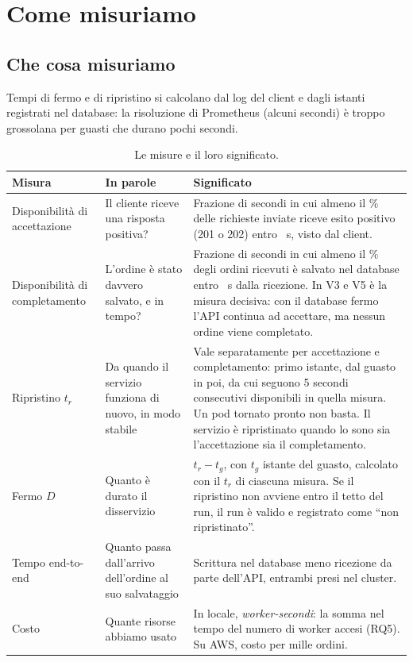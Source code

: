 \section{Come misuriamo}
\label{s:misura}

\subsection{Che cosa misuriamo}

Tempi di fermo e di ripristino si calcolano dal log del client e dagli istanti registrati nel database: la risoluzione di Prometheus (alcuni secondi) è troppo grossolana per guasti che durano pochi secondi.

\begin{table}[H]
\centering
\caption{Le misure e il loro significato.}
\label{tab:definizioni}
\begin{tabularx}{\linewidth}{@{}>{\raggedright\arraybackslash}p{2.9cm}>{\raggedright\arraybackslash}p{3.6cm}L@{}}
\toprule
\textbf{Misura} & \textbf{In parole} & \textbf{Significato} \\
\midrule
Disponibilità di accettazione & Il cliente riceve una risposta positiva? & Frazione di secondi in cui almeno il \% delle richieste inviate riceve esito positivo (201 o 202) entro ~s, visto dal client. \\
Disponibilità di completamento & L'ordine è stato davvero salvato, e in tempo? & Frazione di secondi in cui almeno il \% degli ordini ricevuti è salvato nel database entro ~s dalla ricezione. In V3 e V5 è la misura decisiva: con il database fermo l'API continua ad accettare, ma nessun ordine viene completato. \\
Ripristino $t_r$ & Da quando il servizio funziona di nuovo, in modo stabile & Vale separatamente per accettazione e completamento: primo istante, dal guasto in poi, da cui seguono 5 secondi consecutivi disponibili in quella misura. Un pod tornato pronto non basta. Il servizio è ripristinato quando lo sono sia l'accettazione sia il completamento. \\
Fermo $D$ & Quanto è durato il disservizio & $t_r - t_g$, con $t_g$ istante del guasto, calcolato con il $t_r$ di ciascuna misura. Se il ripristino non avviene entro il tetto del run, il run è valido e registrato come ``non ripristinato''. \\
Tempo end-to-end & Quanto passa dall'arrivo dell'ordine al suo salvataggio & Scrittura nel database meno ricezione da parte dell'API, entrambi presi nel cluster. \\
Costo & Quante risorse abbiamo usato & In locale, \emph{worker-secondi}: la somma nel tempo del numero di worker accesi (RQ5). Su AWS, costo per mille ordini. \\
\bottomrule
\end{tabularx}
\end{table}

